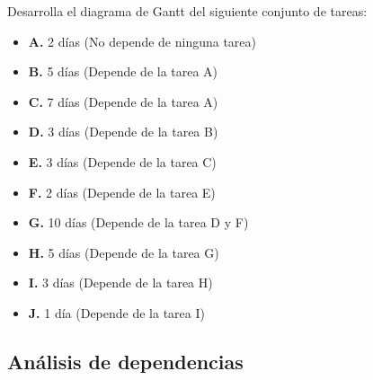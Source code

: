 
\begin{enunciado}
    Desarrolla el diagrama de Gantt del siguiente conjunto de tareas:

    \begin{itemize}[leftmargin=*]
        \item \textbf{A.} 2 días (No depende de ninguna tarea)
        \item \textbf{B.} 5 días (Depende de la tarea A)
        \item \textbf{C.} 7 días (Depende de la tarea A)
        \item \textbf{D.} 3 días (Depende de la tarea B)
        \item \textbf{E.} 3 días (Depende de la tarea C)
        \item \textbf{F.} 2 días (Depende de la tarea E)
        \item \textbf{G.} 10 días (Depende de la tarea D y F)
        \item \textbf{H.} 5 días (Depende de la tarea G)
        \item \textbf{I.} 3 días (Depende de la tarea H)
        \item \textbf{J.} 1 día (Depende de la tarea I)
    \end{itemize}
\end{enunciado}

\subsection{Análisis de dependencias}\label{subsec:analisis-de-dependencias}

